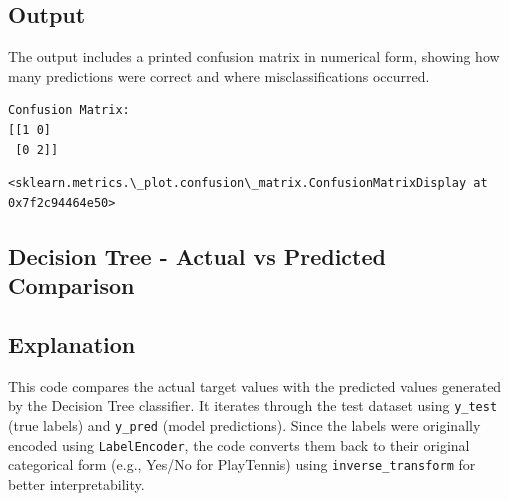 \documentclass[11pt,a4paper]{report}
\makeatletter
\newcommand{\boxspacing}{\kern\kvtcb@left@rule\kern\kvtcb@boxsep}
\newcommand{\prompt}[4]{
        {\ttfamily\llap{{\color{#2}[#3]:\hspace{3pt}#4}}\vspace{-\baselineskip}}
    }
\makeatother
\begin{document}
\subsection*{Output}
The output includes a printed confusion matrix in numerical form, showing how many predictions were correct and where misclassifications occurred. 
\begin{Verbatim}[commandchars=\\\{\}]
Confusion Matrix:
[[1 0]
 [0 2]]
\end{Verbatim}

            \begin{tcolorbox}[breakable, size=fbox, boxrule=.5pt, pad at break*=1mm, opacityfill=0]
\prompt{Out}{outcolor}{11}{\boxspacing}
\begin{Verbatim}[commandchars=\\\{\}]
<sklearn.metrics.\_plot.confusion\_matrix.ConfusionMatrixDisplay at
0x7f2c94464e50>
\end{Verbatim}
\end{tcolorbox}
        
    \begin{center}
    \end{center}
 
    
\subsection{Decision Tree - Actual vs Predicted Comparison}

\subsection*{Explanation}
This code compares the actual target values with the predicted values generated by the Decision Tree classifier. It iterates through the test dataset using \texttt{y\_test} (true labels) and \texttt{y\_pred} (model predictions). Since the labels were originally encoded using \texttt{LabelEncoder}, the code converts them back to their original categorical form (e.g., Yes/No for PlayTennis) using \texttt{inverse\_transform} for better interpretability.
\end{document}
